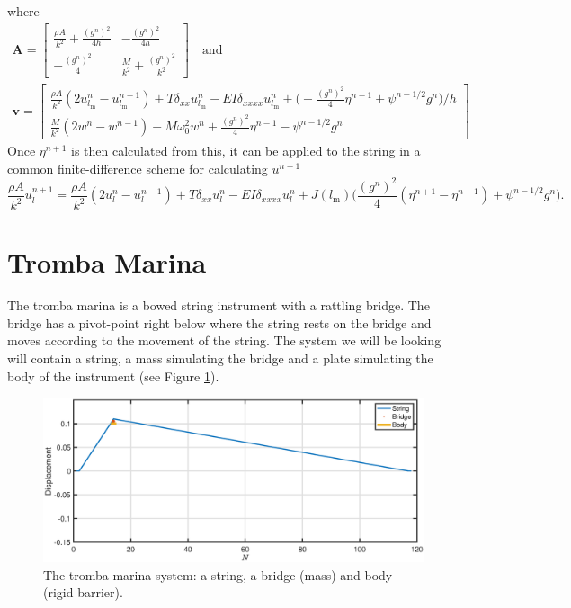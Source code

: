 \documentclass{article}
\begin{document}
where
\begin{equation}
\begin{gathered}
\mathbf{A} = 
    \begin{bmatrix}
        \frac{\rho A}{k^2}+\frac{(g^n)^2}{4h} & -\frac{(g^n)^2}{4h}\\
        -\frac{(g^n)^2}{4} &\frac{M}{k^2}+\frac{(g^n)^2}{k^2}
    \end{bmatrix}
    \quad \text{and}\\
    \mathbf{v} = 
    \begin{bmatrix}
        \frac{\rho A}{k^2}(2u^n_{l_\text{m}}-u_{l_\text{m}}^{n-1})+T\delta_{xx}u_{l_\text{m}}^n-EI\delta_{xxxx}u_{l_\text{m}}^n+\Big(-\frac{(g^n)^2}{4}\eta^{n-1}+\psi^{n-1/2}g^n\Big) / h\\
        \frac{M}{k^2}(2w^n-w^{n-1})-M\omega_0^2w^n+\frac{(g^n)^2}{4}\eta^{n-1}-\psi^{n-1/2}g^n
    \end{bmatrix}
    \nonumber
\end{gathered}
\end{equation}
Once $\eta^{n+1}$ is then calculated from this, it can be applied to the string in a common finite-difference scheme for calculating $u^{n+1}$
\begin{equation}
    \frac{\rho A}{k^2}u^{n+1}_l = \frac{\rho A}{k^2}(2u^n_l-u_l^{n-1})+T\delta_{xx}u_l^n-EI\delta_{xxxx}u_l^n+J(l_\text{m}) \bigg(\frac{(g^n)^2}{4}(\eta^{n+1}-\eta^{n-1})+\psi^{n-1/2}g^n\bigg).
\end{equation}
\section{Tromba Marina}
The tromba marina is a bowed string instrument with a rattling bridge. The bridge has a pivot-point right below where the string rests on the bridge and moves according to the movement of the string. The system we will be looking will contain a string, a mass simulating the bridge and a plate simulating the body of the instrument (see Figure \ref{fig:tromba}). 

\begin{figure}[h]
\centerline{\includegraphics[width=1\columnwidth]{tromba.eps}}
\caption{\label{fig:tromba}{The tromba marina system: a string, a bridge (mass) and body (rigid barrier).}}
\end{figure}
\end{document}
